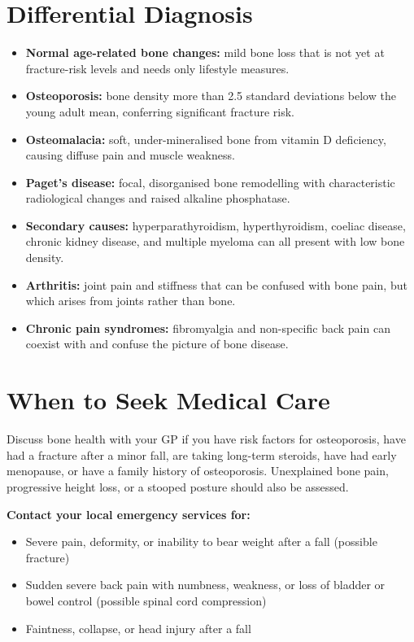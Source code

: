 \section*{Differential Diagnosis}
\begin{itemize}
    \item \textbf{Normal age-related bone changes:} mild bone loss that is not yet at fracture-risk levels and needs only lifestyle measures.
    \item \textbf{Osteoporosis:} bone density more than 2.5 standard deviations below the young adult mean, conferring significant fracture risk.
    \item \textbf{Osteomalacia:} soft, under-mineralised bone from vitamin D deficiency, causing diffuse pain and muscle weakness.
    \item \textbf{Paget's disease:} focal, disorganised bone remodelling with characteristic radiological changes and raised alkaline phosphatase.
    \item \textbf{Secondary causes:} hyperparathyroidism, hyperthyroidism, coeliac disease, chronic kidney disease, and multiple myeloma can all present with low bone density.
    \item \textbf{Arthritis:} joint pain and stiffness that can be confused with bone pain, but which arises from joints rather than bone.
    \item \textbf{Chronic pain syndromes:} fibromyalgia and non-specific back pain can coexist with and confuse the picture of bone disease.
\end{itemize}

\section*{When to Seek Medical Care}
Discuss bone health with your GP if you have risk factors for osteoporosis, have had a fracture after a minor fall, are taking long-term steroids, have had early menopause, or have a family history of osteoporosis. Unexplained bone pain, progressive height loss, or a stooped posture should also be assessed.

\textbf{Contact your local emergency services for:}
\begin{itemize}
    \item Severe pain, deformity, or inability to bear weight after a fall (possible fracture)
    \item Sudden severe back pain with numbness, weakness, or loss of bladder or bowel control (possible spinal cord compression)
    \item Faintness, collapse, or head injury after a fall
\end{itemize}

